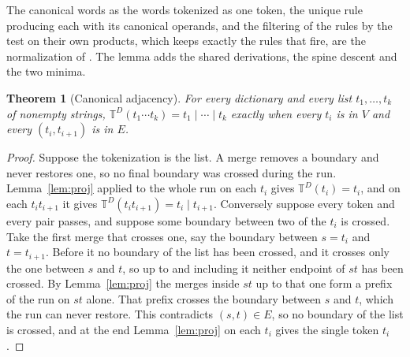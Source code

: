\documentclass[11pt,a4paper]{article}
\theoremstyle{definition}
\theoremstyle{plain}
\newtheorem{theorem}{Theorem}
\newcommand{\T}{\mathbb{T}}
\begin{document}
The canonical words as the words tokenized as one token, the unique rule producing each with its canonical operands, and
the filtering of the rules by the test on their own products, which keeps exactly the rules that fire, are the
normalization of \citet[Section~3.3 and Appendices~A.2 and~C]{jiang2026incremental}. The lemma adds the shared
derivations, the spine descent and the two minima.

\begin{theorem}[Canonical adjacency]\label{thm:bigram}
For every dictionary and every list \(t_1, \dots, t_k\) of nonempty strings,
\(\T^D(t_1 \cdots t_k) = t_1 \mid \cdots \mid t_k\) exactly when every \(t_i\) is in \(V\) and every \((t_i, t_{i+1})\)
is in \(E\).
\end{theorem}

\begin{proof}
Suppose the tokenization is the list. A merge removes a boundary and never restores one, so no final boundary was
crossed during the run. Lemma~\ref{lem:proj} applied to the whole run on each \(t_i\) gives \(\T^D(t_i) = t_i\), and on
each \(t_i t_{i+1}\) it gives \(\T^D(t_i t_{i+1}) = t_i \mid t_{i+1}\). Conversely suppose every token and every pair
passes, and suppose some boundary between two of the \(t_i\) is crossed. Take the first merge that crosses one, say the
boundary between \(s = t_i\) and \(t = t_{i+1}\). Before it no boundary of the list has been crossed, and it crosses
only the one between \(s\) and \(t\), so up to and including it neither endpoint of \(st\) has been crossed. By
Lemma~\ref{lem:proj} the merges inside \(st\) up to that one form a prefix of the run on \(st\) alone. That prefix
crosses the boundary between \(s\) and \(t\), which the run can never restore. This contradicts \((s, t) \in E\), so no
boundary of the list is crossed, and at the end Lemma~\ref{lem:proj} on each \(t_i\) gives the single token \(t_i\).
\end{proof}
\end{document}

